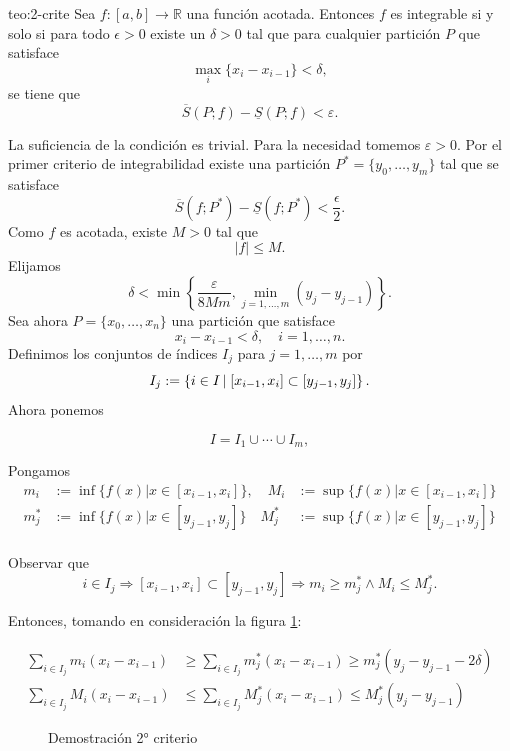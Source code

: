  
\begin{teorema}{teo:2-crite}  Sea $f:[a,b]\to\mathbb{R}$ una función acotada. Entonces  $f$ es integrable si y solo si para todo $\epsilon>0$ existe un $\delta>0$ tal que para cualquier partición $P$ que satisface
\[\max_i\{x_i-x_{i-1}\}<\delta,\]
se tiene que
\begin{equation}\label{eq:Crit1Int}
 \overline{S}(P;f)-\underline{S}(P;f)<\varepsilon.
\end{equation}
 
\end{teorema}
\begin{demo} La suficiencia de la condición es trivial. Para la necesidad tomemos $\varepsilon>0$. Por el primer criterio de integrabilidad existe una partición $P^*=\{y_0,\ldots,y_m\}$ tal que se satisface
\[
 \overline{S}(f;P^*)-\underline{S}(f;P^*)<\frac{\epsilon}{2}.
\]
Como $f$ es acotada, existe $M>0$ tal que
\[
 |f|\leq M.
\]
Elijamos 
\[
 \delta<\min\left\{\frac{\varepsilon}{8Mm},\min_{j=1,\ldots,m}(y_j-y_{j-1})   \right\}  .
\]
Sea ahora $P=\{x_0,\ldots,x_n\}$ una partición que satisface
\[
 x_i-x_{i-1}<\delta,\quad i=1,\ldots,n.
\]
Definimos los conjuntos de índices $I_j$ para $j=1,\ldots,m$ por
\[
 I_j:=\left\{ i\in I\left|\vphantom{ \exists }\right.   [x_{i-1},x_i]\subset [y_{j-1},y_j]\right\}.
\]
Ahora ponemos

\begin{equation*}
  I=I_1\cup\cdots\cup I_m,
\end{equation*}

Pongamos
\begin{eqnarray*}
     m_i&:=\inf\{f(x)| x\in [x_{i-1},x_i]\},\quad     M_i&:=\sup\{f(x)| x\in [x_{i-1},x_i]\}\\
    m^*_j&:=\inf\{f(x)| x\in [y_{j-1},y_j]\}\quad
    M^*_j&:=\sup\{f(x)| x\in [y_{j-1},y_j]\}\\
\end{eqnarray*}

Observar que
\[
 i\in I_j\Rightarrow  [x_{i-1},x_i]\subset [y_{j-1},y_j]\Rightarrow
m_i\geq m^*_j \wedge M_i\leq M^*_j.
\]


Entonces, tomando en consideración la figura \ref{fig:crite2}:

\begin{equation}\label{eq:2drite_estima_suma}
 \begin{split}
   \sum_{i\in I_j}m_i(x_i-x_{i-1})&\geq \sum_{i\in I_j}m^*_j(x_i-x_{i-1}) \geq  m^*_j(y_j-y_{j-1}-2\delta)\\
 \sum_{i\in I_j}M_i(x_i-x_{i-1})&\leq \sum_{i\in I_j}M^*_j(x_i-x_{i-1}) \leq  M^*_j(y_j-y_{j-1})
 \end{split}
\end{equation}
\begin{figure}[H]
 \begin{center}

 \end{center}
 \caption{Demostración 2° criterio}\label{fig:crite2}
\end{figure}


\end{demo}
